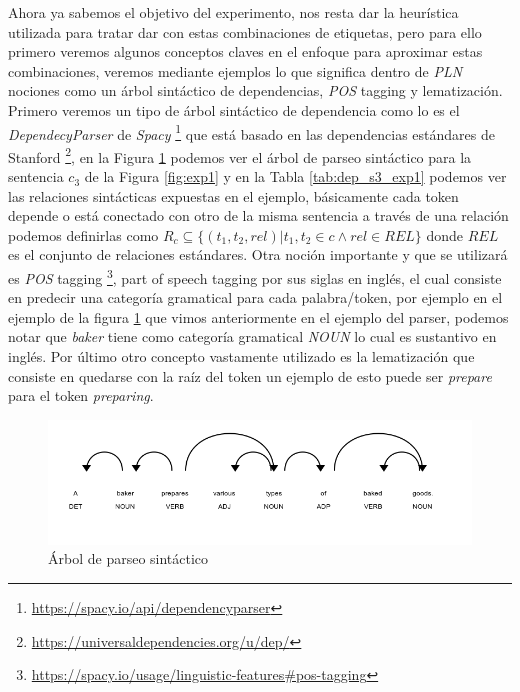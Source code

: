 Ahora ya sabemos el objetivo del experimento, nos resta dar la heurística utilizada para tratar dar con estas combinaciones de etiquetas, pero para ello primero veremos algunos conceptos claves en el enfoque para aproximar estas combinaciones, veremos mediante ejemplos lo que significa dentro de \textit{PLN} nociones como un árbol sintáctico de dependencias, \textit{POS} tagging y lematización. Primero veremos un tipo de árbol sintáctico de dependencia como lo es el \textit{DependecyParser} de \textit{Spacy} \footnote{\url{https://spacy.io/api/dependencyparser}} que está basado en las dependencias estándares de Stanford \cite{de-marneffe-etal-2014-universal} \footnote{\url{https://universaldependencies.org/u/dep/}}, en la Figura \ref{fig:Syntacti_parser} podemos ver el árbol de parseo sintáctico para la sentencia $c_{3}$ de la Figura \ref{fig:exp1} y en la Tabla \ref{tab:dep_s3_exp1} podemos ver las relaciones sintácticas expuestas en el ejemplo, básicamente cada token depende o está conectado con otro de la misma sentencia a través de una relación podemos definirlas como $R_{c} \subseteq \{(t_{1},t_{2}, rel )  |  t_{1},t_{2}  \in c  \land rel \in REL\}$ donde $REL$ es el conjunto de relaciones estándares. Otra noción importante y que se utilizará es \textit{POS} tagging \footnote{\url{https://spacy.io/usage/linguistic-features#pos-tagging}}, part of speech tagging por sus siglas en inglés, el cual consiste en predecir una categoría gramatical para cada palabra/token, por ejemplo en el ejemplo de la figura \ref{fig:Syntacti_parser} que vimos anteriormente en el ejemplo del parser, podemos notar que \textit{baker} tiene como categoría gramatical \textit{NOUN} lo cual es sustantivo en inglés. Por último otro concepto vastamente utilizado es la lematización  que consiste en quedarse con la raíz del token un ejemplo de esto puede ser \textit{prepare} para el token \textit{preparing}.

\begin{figure}
\begin{center}
    \includegraphics[width=\textwidth]{images/image218.png}
    \caption{Árbol de parseo sintáctico}
    \label{fig:Syntacti_parser}
\end{center}
\end{figure}

